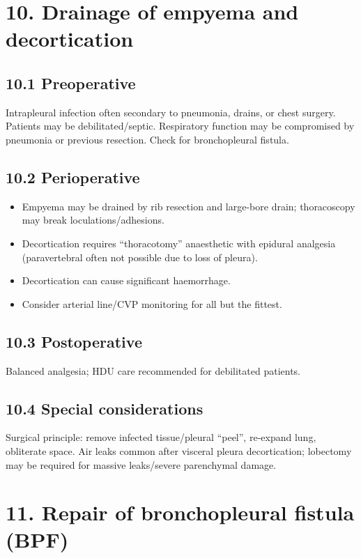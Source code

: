 \documentclass[11pt,a4paper]{article}
\begin{document}
\section{10. Drainage of empyema and decortication}

\subsection{10.1 Preoperative}
Intrapleural infection often secondary to pneumonia, drains, or chest surgery. Patients may be debilitated/septic. Respiratory function may be compromised by pneumonia or previous resection. Check for bronchopleural fistula.

\subsection{10.2 Perioperative}
\begin{itemize}[leftmargin=*, itemsep=2pt]
  \item Empyema may be drained by rib resection and large-bore drain; thoracoscopy may break loculations/adhesions.
  \item Decortication requires ``thoracotomy'' anaesthetic with epidural analgesia (paravertebral often not possible due to loss of pleura).
  \item Decortication can cause significant haemorrhage.
  \item Consider arterial line/CVP monitoring for all but the fittest.
\end{itemize}

\subsection{10.3 Postoperative}
Balanced analgesia; HDU care recommended for debilitated patients.

\subsection{10.4 Special considerations}
Surgical principle: remove infected tissue/pleural ``peel'', re-expand lung, obliterate space. Air leaks common after visceral pleura decortication; lobectomy may be required for massive leaks/severe parenchymal damage.

\section{11. Repair of bronchopleural fistula (BPF)}
\end{document}
